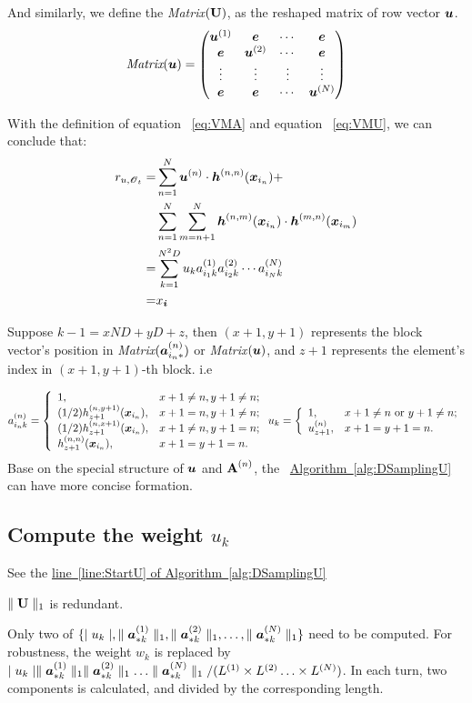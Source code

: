 \documentclass{article}
\newcommand{\Sca}[3]{{#1}^{(#2)}_{i_#2#3}}%
\newcommand{\T}[1]{\boldsymbol{\mathscr{\MakeUppercase{#1}}}}%
\newcommand{\V}[1]{{\bm{{\MakeLowercase{#1}}}}}%
\newcommand{\Varow}[1]{\V{a}^{(#1)}_{i_#1*}}
\newcommand{\Vacol}[1]{\V{a}^{(#1)}_{*k}}
\newcommand{\Vh}[2]{\V{h}^{(#1,#2)}{(\V{x}_{i_#1}})}
\newcommand{\M}[1]{{\bm{\mathbf{\MakeUppercase{#1}}}}}%
\newcommand{\norm}[2]{\parallel#1\parallel_{#2}}
\newcommand{\Alg}[1]{\hyperref[alg:#1]{Algorithm~\ref*{alg:#1}}}
\newcommand{\AlgLine}[2]{\hyperref[alg:#1]{line~\ref*{line:#2} of Algorithm~\ref*{alg:#1}}}
\begin{document}
And similarly, we define the \emph{Matrix}$(\M{U})$, as the reshaped matrix of row vector $\V{U}$.
\begin{equation}
\label{eq:VMU}
\emph{Matrix}(\V{U})=
\begin{pmatrix}
\V{u}^{(1)} & \V{e}       & \cdots & \V{e} \cr
\V{e}       & \V{u}^{(2)} & \cdots & \V{e}\cr
\vdots      & \vdots      & \vdots & \vdots\cr
\V{e}       & \V{e}       & \cdots & \V{u}^{(N)}\cr
\end{pmatrix}
\end{equation}

With the definition of equation ~\ref{eq:VMA} and equation ~\ref{eq:VMU}, we can conclude that:
\begin{align*}
r_{u,\T{O}_t} =
&\sum_{n=1}^{N}\V{u}^{(n)}\cdot\Vh{n}{n}+\\
&\sum_{n=1}^{N}\sum_{m=n+1}^{N}\Vh{n}{m}\cdot\Vh{m}{n}\\
=&\sum_{k=1}^{N^2D}u_{k}\Sca{a}{1}{k}\Sca{a}{2}{k}\cdots\Sca{a}{N}{k}\\
=&x_{\V{i}}
\end{align*}

Suppose $k-1 = xND + yD + z$, then $(x+1,y+1)$ represents the block vector's position in \emph{Matrix}$(\Varow{n})$ or \emph{Matrix}$(\V{U})$, and $z+1$ represents the element's index in $(x+1,y+1)$-th block. i.e

\begin{equation*}
\Sca{a}{n}{k}=
\left\{
  \begin{array}{ll}
    1, & \hbox{$x+1\neq n,y+1\neq n$;} \\
    (1/2)h^{(n,y+1)}_{z+1}(\V{x}_{i_{n}}), & \hbox{$x+1 = n,y+1\neq n$;} \\
    (1/2)h^{(n,x+1)}_{z+1}(\V{x}_{i_{n}}), & \hbox{$x+1 \neq n,y+1 = n$;} \\
    h^{(n,n)}_{z+1}(\V{x}_{i_{n}}), & \hbox{$x+1 = y+1 = n$.}
  \end{array}
\right.
u_k =
\left\{
  \begin{array}{ll}
    1, & \hbox{$x+1\neq n$ or $y+1\neq n$;} \\
    u^{(n)}_{z+1}, & \hbox{$x+1 = y+1 = n$.}
  \end{array}
\right.
\end{equation*}
Base on the special structure of $\V{U}$ and $\M{A}^{(n)}$, the ~\Alg{DSamplingU} can have more concise formation.

\subsection{Compute the weight $u_k$}
See the \AlgLine{DSamplingU}{StartU}
\begin{asparaitem}
\item
$\norm{\M{U}}{1}$ is redundant.
\item
Only two of $\{\mid u_k \mid,\norm{\Vacol{1}}{1},\norm{\Vacol{2}}{1},\ldots,\norm{\Vacol{N}}{1} \}$ need to be computed. For robustness, the weight $w_k$ is replaced by $\mid u_k \mid
    \norm{\Vacol{1}}{1}\norm{\Vacol{2}}{1}\ldots\norm{\Vacol{N}}{1}/(L^{(1)}\times L^{(2)}\ldots\times L^{(N)})$. In each turn, two components is calculated, and divided by the corresponding length.
\end{asparaitem}
\end{document}
